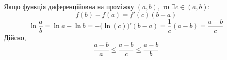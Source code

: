 \documentclass[../rgr1.tex]{subfiles}
\begin{document}

\Solution

Якщо функція диференційовна на проміжку $(a,b), \text{~то~} \exists c\in(a,b):$
\begin{equation}
	f(b)-f(a)=f'(c)(b-a)
\end{equation}
\begin{equation}
	\ln\frac{a}{b}=
	\ln a -\ln b=
	-\big(\ln(c)\big)'(b-a)=
	\frac{1}{c}(a-b)=
	\frac{a-b}{c}
\end{equation}
Дійсно,
\begin{equation}
	\frac{a-b}{a} \leq
	\frac{a-b}{c}
	\leq \frac{a-b}{b}
\end{equation}

\end{document}
